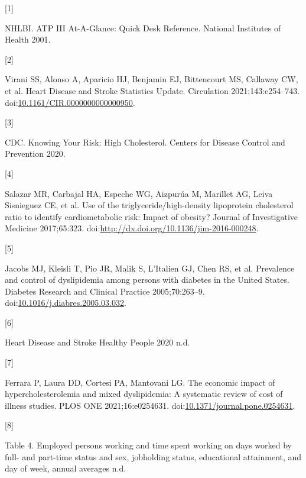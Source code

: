 \documentclass[]{elsarticle} %
\newlength{\cslhangindent}
\newlength{\csllabelwidth}
\newenvironment{CSLReferences}[2] %
 {%
  \setlength{\parindent}{0pt}
  \ifodd #1 \everypar{\setlength{\hangindent}{\cslhangindent}}\ignorespaces\fi
  \ifnum #2 > 0
  \setlength{\parskip}{#2\baselineskip}
  \fi
 }%
 {}
\newcommand{\CSLLeftMargin}[1]{\parbox[t]{\csllabelwidth}{#1}}
\newcommand{\CSLRightInline}[1]{\parbox[t]{\linewidth - \csllabelwidth}{#1}\break}
\begin{document}
\hypertarget{refs}{}
\begin{CSLReferences}{0}{0}
\leavevmode{}%
\CSLLeftMargin{{[}1{]} }
\CSLRightInline{NHLBI. {ATP III At-A-Glance}: {Quick Desk Reference}.
National Institutes of Health 2001.}

\leavevmode{}%
\CSLLeftMargin{{[}2{]} }
\CSLRightInline{Virani SS, Alonso A, Aparicio HJ, Benjamin EJ,
Bittencourt MS, Callaway CW, et al. Heart {Disease} and {Stroke
Statistics}\textemdash 2021 {Update}. Circulation 2021;143:e254--743.
doi:\href{https://doi.org/10.1161/CIR.0000000000000950}{10.1161/CIR.0000000000000950}.}

\leavevmode{}%
\CSLLeftMargin{{[}3{]} }
\CSLRightInline{CDC. Knowing {Your Risk}: {High Cholesterol}. Centers
for Disease Control and Prevention 2020.}

\leavevmode{}%
\CSLLeftMargin{{[}4{]} }
\CSLRightInline{Salazar MR, Carbajal HA, Espeche WG, Aizpurúa M,
Marillet AG, Leiva Sisnieguez CE, et al. Use of the
triglyceride/high-density lipoprotein cholesterol ratio to identify
cardiometabolic risk: Impact of obesity? Journal of Investigative
Medicine 2017;65:323.
doi:\url{http://dx.doi.org/10.1136/jim-2016-000248}.}

\leavevmode{}%
\CSLLeftMargin{{[}5{]} }
\CSLRightInline{Jacobs MJ, Kleisli T, Pio JR, Malik S, L'Italien GJ,
Chen RS, et al. Prevalence and control of dyslipidemia among persons
with diabetes in the {United States}. Diabetes Research and Clinical
Practice 2005;70:263--9.
doi:\href{https://doi.org/10.1016/j.diabres.2005.03.032}{10.1016/j.diabres.2005.03.032}.}

\leavevmode{}%
\CSLLeftMargin{{[}6{]} }
\CSLRightInline{Heart {Disease} and {Stroke} \textbar{} {Healthy People}
2020 n.d.}

\leavevmode{}%
\CSLLeftMargin{{[}7{]} }
\CSLRightInline{Ferrara P, Laura DD, Cortesi PA, Mantovani LG. The
economic impact of hypercholesterolemia and mixed dyslipidemia: {A}
systematic review of cost of illness studies. PLOS ONE 2021;16:e0254631.
doi:\href{https://doi.org/10.1371/journal.pone.0254631}{10.1371/journal.pone.0254631}.}

\leavevmode{}%
\CSLLeftMargin{{[}8{]} }
\CSLRightInline{Table 4. {Employed} persons working and time spent
working on days worked by full- and part-time status and sex, jobholding
status, educational attainment, and day of week, annual averages n.d.}


\end{CSLReferences}
\end{document}
